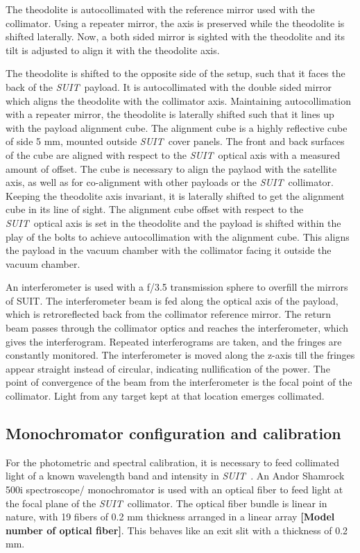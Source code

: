 \documentclass[12pt]{spieman}  %
\newcommand{\suit}{{\it SUIT~}}
\newcommand{\js}[1]{{\bf\color{magenta} [#1]}}
\begin{document}
The theodolite is autocollimated with the reference mirror used with the collimator. Using a repeater mirror, the axis is preserved while the theodolite is shifted laterally. Now, a both sided mirror is sighted with the theodolite and its tilt is adjusted to align it with the theodolite axis.
	
The theodolite is shifted to the opposite side of the setup, such that it faces the back of the \suit payload. It is autocollimated with the double sided mirror which aligns the theodolite with the collimator axis. Maintaining autocollimation with a repeater mirror, the theodolite is laterally shifted such that it lines up with the payload alignment cube.
The alignment cube is a highly reflective cube of side 5 mm, mounted outside \suit cover panels. The front and back surfaces of the cube are aligned with respect to the \suit optical axis with a measured amount of offset. The cube is necessary to align the paylaod with the satellite axis, as well as for co-alignment with other payloads or the \suit collimator.
Keeping the theodolite axis invariant, it is laterally shifted to get the alignment cube in its line of sight. The alignment cube offset with respect to the \suit optical axis is set in the theodolite and the payload is shifted within the play of the bolts to achieve autocollimation with the alignment cube. This aligns the payload in the vacuum chamber with the collimator facing it outside the vacuum chamber.
	
An interferometer is used with a f/3.5 transmission sphere to overfill the mirrors of SUIT. The interferometer beam is fed along the optical axis of the payload, which is retroreflected back from the collimator reference mirror. The return beam passes through the collimator optics and reaches the interferometer, which gives the  interferogram. Repeated interferograms are taken, and the fringes are constantly monitored. The interferometer is moved along the z-axis till the fringes appear straight instead of circular, indicating nullification of the power. The point of convergence of the beam from the interferometer is the focal point of the collimator. Light from any target kept at that location emerges collimated. 

\subsection{Monochromator configuration and calibration}
For the photometric and spectral calibration, it is necessary to feed collimated light of a known wavelength band and intensity in \suit.
An Andor Shamrock 500i spectroscope/ monochromator is used with an optical fiber to feed light at the focal plane of the \suit collimator. The optical fiber bundle is linear in nature, with 19 fibers of 0.2 mm thickness arranged in a linear array \js{Model number of optical fiber}. This behaves like an exit slit with a thickness of 0.2 mm.
\end{document}
